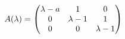 \documentclass[preview]{standalone}
\begin{document}
\begin{align*}
\special{dvisvgm:raw <g id='unique000'>}A(\lambda)=\begin{pmatrix}\lambda-a&1&0\\0&\lambda-1&1\\0&0&\lambda-1\end{pmatrix}\special{dvisvgm:raw </g>}
\end{align*}
\end{document}
